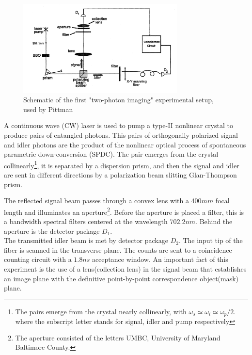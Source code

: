 \begin{figure}[h]
\centering
\includegraphics[width=0.75\textwidth]{Figures/pittman.png}
\caption{Schematic of the first "two-photon imaging" experimental setup, used by Pittman\cite{pittman}} 
\label{fig:pittman}
\end{figure}
A continuous wave (CW) laser is used to pump a type-II nonlinear 
crystal to produce pairs of entangled photons. This pairs of orthogonally polarized signal and idler photons are the product
of the nonlinear optical process of spontaneous parametric down-conversion (SPDC).
The pair emerges from the crystal collinearly\footnote{The pairs emerge from the crystal nearly 
collinearly, with $\omega_s \simeq \omega_i \simeq \omega_p / 2$. where the subscript
letter stands for signal, idler and pump respectively}, it is separated by a dispersion prism, 
and then the signal and idler are sent in different directions by a polarization
beam slitting Glan-Thompson prism. 

The reflected signal beam passes through a 
convex lens with a $400mm$ focal length and illuminates an aperture\footnote{The aperture 
consisted of the letters UMBC, University of Maryland Baltimore County.}.
Before the aperture is placed a filter, 
this is a bandwidth spectral filters centered at the
wavelength $702.2 nm$. 
Behind the aperture is the detector package $D_1$. \\


The transmitted idler beam is met by detector 
package $D_2$. The input tip of the fiber is scanned in the transverse 
plane. The counts are sent to a coincidence 
counting circuit with a $1.8ns$ acceptance window.
An important fact of this experiment is the use of a lens(collection lens) in the signal beam that establishes 
an image plane with the definitive point-by-point correspondence object(mask) plane.\\

